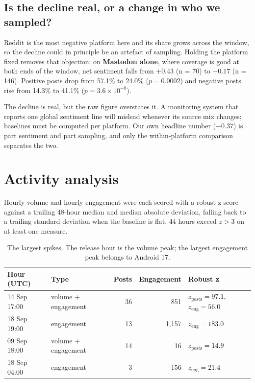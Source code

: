 \documentclass[11pt,a4paper]{article}
\begin{document}
\subsection{Is the decline real, or a change in who we sampled?}

Reddit is the most negative platform here and its share grows across the window, so the decline could in principle be an artefact of sampling. Holding the platform fixed removes that objection: on \textbf{Mastodon alone}, where coverage is good at both ends of the window, net sentiment falls from $+0.43$ (n = 70) to $-0.17$ (n = 146). Positive posts drop from 57.1\% to 24.0\% ($p = 0.0002$) and negative posts rise from 14.3\% to 41.1\% ($p = 3.6 \times 10^{-8}$).

\begin{insightbox}
The decline is real, but the raw figure overstates it. A monitoring system that reports one global sentiment line will mislead whenever its source mix changes; baselines must be computed per platform. Our own headline number ($-0.37$) is part sentiment and part sampling, and only the within-platform comparison separates the two.
\end{insightbox}

\section{Activity analysis}

Hourly volume and hourly engagement were each scored with a robust z-score against a trailing 48-hour median and median absolute deviation, falling back to a trailing standard deviation when the baseline is flat. 44 hours exceed $z > 3$ on at least one measure.

\begin{table}[H]
\centering\small
\begin{tabular}{@{}llrrl@{}}
\toprule
\textbf{Hour (UTC)} & \textbf{Type} & \textbf{Posts} & \textbf{Engagement} & \textbf{Robust z} \\
\midrule
14 Sep 17:00 & volume + engagement & 36 & 851   & $z_{\text{posts}} = 97.1$, $z_{\text{eng}} = 56.0$ \\
18 Sep 19:00 & engagement          & 13 & 1,157 & $z_{\text{eng}} = 183.0$ \\
09 Sep 18:00 & volume + engagement & 14 & 16    & $z_{\text{posts}} = 14.9$ \\
18 Sep 04:00 & engagement          & 3  & 156   & $z_{\text{eng}} = 21.4$ \\
\bottomrule
\end{tabular}
\caption{The largest spikes. The release hour is the volume peak; the largest engagement peak belongs to Android 17.}
\end{table}
\end{document}

